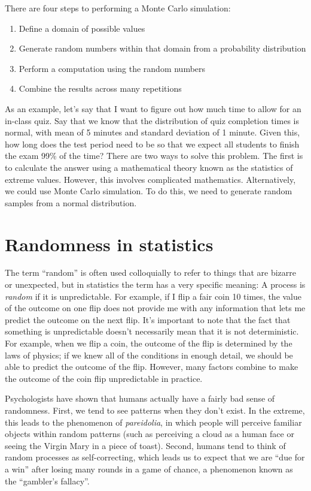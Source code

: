 \documentclass[12pt,]{book}
\providecommand{\tightlist}{%
  \setlength{\itemsep}{0pt}\setlength{\parskip}{0pt}}
\theoremstyle{definition}
\theoremstyle{definition}
\theoremstyle{definition}
\theoremstyle{remark}
\begin{document}
There are four steps to performing a Monte Carlo simulation:

\begin{enumerate}
\def\labelenumi{\arabic{enumi}.}
\tightlist
\item
  Define a domain of possible values
\item
  Generate random numbers within that domain from a probability distribution
\item
  Perform a computation using the random numbers
\item
  Combine the results across many repetitions
\end{enumerate}

As an example, let's say that I want to figure out how much time to allow for an in-class quiz. Say that we know that the distribution of quiz completion times is normal, with mean of 5 minutes and standard deviation of 1 minute. Given this, how long does the test period need to be so that we expect all students to finish the exam 99\% of the time? There are two ways to solve this problem. The first is to calculate the answer using a mathematical theory known as the statistics of extreme values. However, this involves complicated mathematics. Alternatively, we could use Monte Carlo simulation. To do this, we need to generate random samples from a normal distribution.

\hypertarget{randomness-in-statistics}{%
\section{Randomness in statistics}\label{randomness-in-statistics}}

The term ``random'' is often used colloquially to refer to things that are bizarre or unexpected, but in statistics the term has a very specific meaning: A process is \emph{random} if it is unpredictable. For example, if I flip a fair coin 10 times, the value of the outcome on one flip does not provide me with any information that lets me predict the outcome on the next flip. It's important to note that the fact that something is unpredictable doesn't necessarily mean that it is not deterministic. For example, when we flip a coin, the outcome of the flip is determined by the laws of physics; if we knew all of the conditions in enough detail, we should be able to predict the outcome of the flip. However, many factors combine to make the outcome of the coin flip unpredictable in practice.

Psychologists have shown that humans actually have a fairly bad sense of randomness. First, we tend to see patterns when they don't exist. In the extreme, this leads to the phenomenon of \emph{pareidolia}, in which people will perceive familiar objects within random patterns (such as perceiving a cloud as a human face or seeing the Virgin Mary in a piece of toast). Second, humans tend to think of random processes as self-correcting, which leads us to expect that we are ``due for a win'' after losing many rounds in a game of chance, a phenomenon known as the ``gambler's fallacy''.
\end{document}
